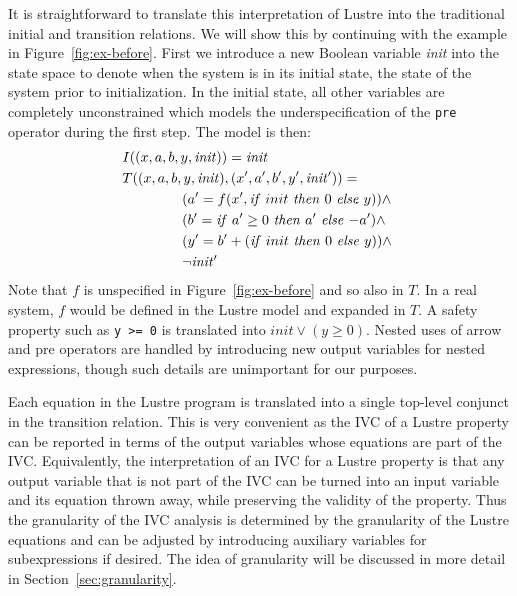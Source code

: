 It is straightforward to translate this interpretation of Lustre into
the traditional initial and transition relations. We will show this by
continuing with the example in Figure~\ref{fig:ex-before}. First we
introduce a new Boolean variable \textit{init} into the state space to denote
when the system is in its initial state, the state of the system prior
to initialization. In the initial state, all other variables are
completely unconstrained which models the underspecification of the \texttt{pre}
operator during the first step. The model is then:
\begin{align*}
  &I((x, a, b, y, \mathit{init})) = \mathit{init} \\
  &T((x, a, b, y, \mathit{init}), (x', a', b', y', \mathit{init'})) = \\
  &\hspace{1.5cm} (a' = f(x', \mathit{if}\ {init}\ \mathit{then}\ {0}\ \mathit{else}\ {y})) \land~ \\
  &\hspace{1.5cm} (b' = \mathit{if}\ {a' \geq 0}\ \mathit{then}\ {a'}\ \mathit{else}\ {-a'}) \land~ \\
  &\hspace{1.5cm} (y' = b' + (\mathit{if}\ {init}\ \mathit{then}\ {0}\ \mathit{else}\ {y})) \land ~\\
  &\hspace{1.5cm} \neg\mathit{init'}
\end{align*}
Note that $f$ is unspecified in Figure~\ref{fig:ex-before} and so also
in $T$. In a real system, $f$ would be defined in the Lustre model and
expanded in $T$. A safety property such as {\tt y >= 0} is translated
into $\mathit{init} \lor (y \geq 0)$. Nested uses of arrow and pre
operators are handled by introducing new output variables for nested
expressions, though such details are unimportant for our purposes.

Each equation in the Lustre program is translated into a single
top-level conjunct in the transition relation. This is very convenient
as the IVC of a Lustre property can be reported in terms of the output
variables whose equations are part of the IVC. Equivalently, the
interpretation of an IVC for a Lustre property is that any output
variable that is not part of the IVC can be turned into an input
variable and its equation thrown away, while preserving the validity of
the property. Thus the granularity of the IVC analysis is determined
by the granularity of the Lustre equations and can be adjusted by
introducing auxiliary variables for subexpressions if desired.  The idea of granularity will be discussed in more detail in Section~\ref{sec:granularity}.

